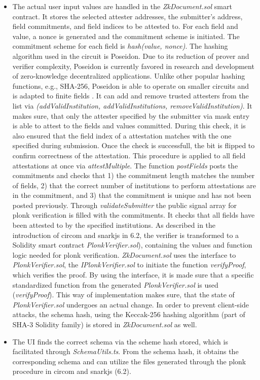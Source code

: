 \begin{itemize}
\item The actual user input values are handled in the \textit{ZkDocument.sol} smart contract. It stores the selected attester addresses, the submitter's address, field commitments, and field indices to be attested to. For each field and value, a nonce is generated and the commitment scheme is initiated. The commitment scheme for each field is \textit{hash(value, nonce)}. The hashing algorithm used in the circuit is Poseidon. Due to its reduction of prover and verifier complexity, Poseidon is currently favored in research and development of zero-knowledge decentralized applications. Unlike other popular hashing functions, e.g., SHA-256, Poseidon is able to operate on smaller circuits and is adapted to finite fields \citep{poseidon}. It can add and remove trusted attesters from the list via \textit{(addValidInstitution, addValidInstitutions, removeValidInstitution)}. It makes sure, that only the attester specified by the submitter via mask entry is able to attest to the fields and values committed. During this check, it is also ensured that the field index of a attestation matches with the one specified during submission. Once the check is successfull, the bit is flipped to confirm correctness of the attestation. This procedure is applied to all field attestations at once via \textit{attestMultiple}. The function \textit{postFields} posts the commitments and checks that 1) the commitment length matches the number of fields, 2) that the correct number of institutions to perform attestations are in the commitment, and 3) that the commitment is unique and has not been posted previously. Through \textit{validateSubmitter} the public signal array for plonk verification is filled with the commitments. It checks that all fields have been attested to by the specified institutions. As described in the introduction of circom and snarkjs in 6.2, the verifier is transformed to a Solidity smart contract \textit{PlonkVerifier.sol}), containing the values and function logic needed for plonk verification. \textit{ZkDocument.sol} uses the interface to \textit{PlonkVerifier.sol}, the \textit{IPlonkVerifier.sol} to initiate the function \textit{verifyProof}, which verifies the proof. By using the interface, it is made sure that a specific standardized function from the generated \textit{PlonkVerifier.sol} is used (\textit{verifyProof}). This way of implementation makes sure, that the state of \textit{PlonkVerifier.sol} undergoes an actual change. In order to prevent client-side attacks, the schema hash, using the Keccak-256 hashing algorithm (part of SHA-3 Solidity family) is stored in \textit{ZkDocument.sol} as well. 

\item The UI finds the correct schema via the scheme hash stored, which is facilitated through \textit{SchemaUtils.ts}. From the schema hash, it obtains the corresponding schema and can utilize the files generated through the plonk procedure in circom and snarkjs (6.2).
\end{itemize}
